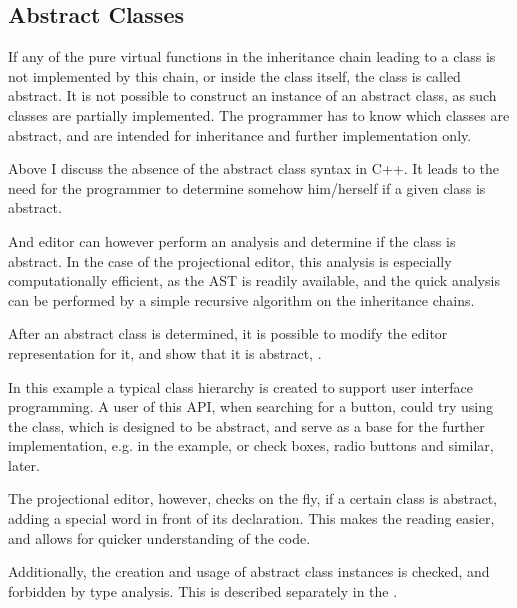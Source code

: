 \subsection{Abstract Classes}

If any of the pure virtual functions in the inheritance chain leading to a class is not implemented by this chain, 
or inside the class itself, the class is called abstract. It is not possible to construct an instance of an
abstract class, as such classes are partially implemented. The programmer has to know which classes are abstract,
and are intended for inheritance and further implementation only.

Above I discuss the absence of the abstract class syntax in C++. It leads to the need for the programmer to 
determine somehow him/herself if a given class is abstract. 

And editor can however perform an analysis and determine if the class is abstract. In the case of the projectional
editor, this analysis is especially computationally efficient, as the AST is readily available, and the quick 
analysis can be performed by a simple recursive algorithm on the inheritance chains.

After an abstract class is determined, it is possible to modify the editor representation for it, and show that it is 
abstract, .

In this example a typical class hierarchy is created to support user interface programming. A user of this API, when 
searching for a button, could try using the  class, which is designed to be abstract, and serve as a 
base for the further implementation, e.g.  in the example, or check boxes, radio buttons and similar,
later.


The projectional editor, however, checks on the fly, if a certain class is abstract, adding a special  word 
in front of its declaration. This makes the reading easier, and allows for quicker understanding of the code. 

Additionally, the creation and usage of abstract class instances is checked, and forbidden by type analysis. This is 
described separately in the .